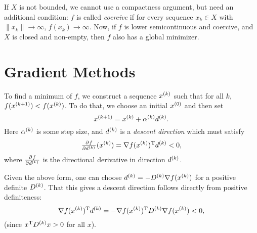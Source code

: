 \documentclass{article}
\begin{document}
If \(X\) is not bounded, we cannot use a compactness argument, but need an additional condition:
\(f\) is called \emph{coercive} if for every sequence \({x_k} \in X\) with \(\lVert x_k \rVert \to
\infty\), \(f(x_k) \to \infty\).  Now, if \(f\) is lower semicontinuous and coercive, and \(X\) is
closed and non-empty, then \(f\) also has a global minimizer.

\section{Gradient Methods}

\label{s:gradient-methods}

To find a minimum of \(f\), we construct a sequence \(\kth{x}\) such that for all \(k\),
\(f(\kth[k+1]{x}) < f(\kth{x})\).  To do that, we choose an initial \(\kth[0]{x}\) and then set
\begin{equation*}
  \kth[k+1]{x} = \kth{x} + \kth{\alpha} \kth{d}.
\end{equation*}
Here \(\kth{\alpha}\) is some step size, and \(\kth{d}\) is a \emph{descent direction} which must
satisfy
\begin{equation*}
  \pd{f}{{\kth{d}}}(\kth{x}) = \T{\nabla f(\kth{x})} \kth{d} < 0, 
\end{equation*}
where \(\pd{f}{{\kth{d}}}\) is the directional derivative in direction \(\kth{d}\).


\label{s:scaled-gradients}

Given the above form, one can choose \(\kth{d} = -\kth{D} \nabla f(\kth{x})\) for a positive
definite \(\kth{D}\).  That this gives a descent direction follows directly from positive
definiteness:
\begin{equation*}
  \T{\nabla f(\kth{x})} \kth{d} = -\T{\nabla f(\kth{x})} \kth{D} \nabla f(\kth{x}) < 0,
\end{equation*}
(since \(\T{x}\kth{D}x > 0\) for all \(x\)).
\end{document}
